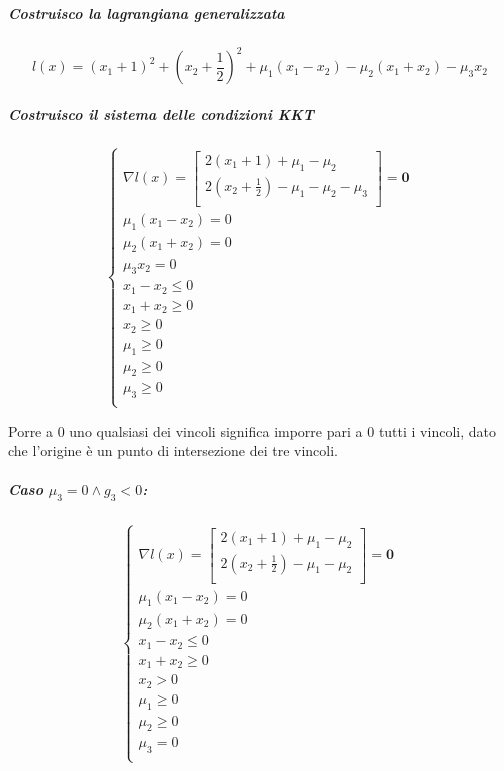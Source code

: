 \documentclass[\main/main.tex]{subfiles}
\begin{document}
\subparagraph*{Costruisco la lagrangiana generalizzata}

\[
  l(x) = (x_1+1)^2 + (x_2 + \frac{1}{2})^2 + \mu_1(x_1 - x_2) - \mu_2(x_1 + x_2) - \mu_3x_2
\]

\subparagraph*{Costruisco il sistema delle condizioni KKT}
\[
  \begin{cases}
    \nabla l(x) = \begin{bmatrix}
      2(x_1+1) + \mu_1 - \mu_2                   \\
      2(x_2+\frac{1}{2}) - \mu_1 - \mu_2 - \mu_3 \\
    \end{bmatrix} = \bm{0} \\
    \mu_1(x_1 - x_2) = 0                             \\
    \mu_2(x_1 + x_2) = 0                             \\
    \mu_3x_2 = 0                                     \\
    x_1 - x_2 \leq 0                                 \\
    x_1 + x_2 \geq 0                                 \\
    x_2 \geq 0                                       \\
    \mu_1 \geq 0                                     \\
    \mu_2 \geq 0                                     \\
    \mu_3 \geq 0                                     \\
  \end{cases}
\]

Porre a $0$ uno qualsiasi dei vincoli significa imporre pari a $0$ tutti i vincoli, dato che l'origine è un punto di intersezione dei tre vincoli.

\subparagraph*{Caso $\mu_3 = 0 \land g_3 < 0$:}

\[
  \begin{cases}
    \nabla l(x) = \begin{bmatrix}
      2(x_1+1) + \mu_1 - \mu_2           \\
      2(x_2+\frac{1}{2}) - \mu_1 - \mu_2 \\
    \end{bmatrix} = \bm{0} \\
    \mu_1(x_1 - x_2) = 0                              \\
    \mu_2(x_1 + x_2) = 0                              \\
    x_1 - x_2 \leq 0                                  \\
    x_1 + x_2 \geq 0                                  \\
    x_2 > 0                                           \\
    \mu_1 \geq 0                                      \\
    \mu_2 \geq 0                                      \\
    \mu_3 = 0                                         \\
  \end{cases}
\]
\end{document}
